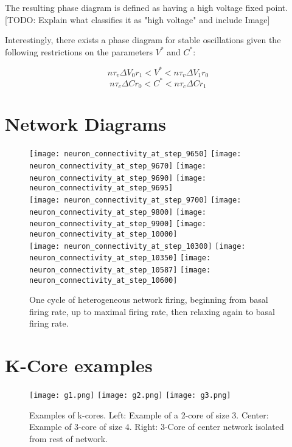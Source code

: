 \documentclass[11pt,letterpaper]{article}
\begin{document}
\begin{appendices}
The resulting phase diagram is defined as having a high voltage fixed point. [TODO: Explain what classifies it as "high voltage" and include Image]

Interestingly, there exists a phase diagram for stable oscillations given the following restrictions on the parameters $V^*$ and $C^*$:

\begin{equation}
n\tau _v \Delta V_0 r_1 < V^* < n\tau _v \Delta V_1 r_0
\end{equation}
\begin{equation}
n\tau _c \Delta C r_0 < C^* < n\tau_c \Delta C r_1
\end{equation}

\newpage
\section{Network Diagrams}
\label{appendix:network_diagrams}
\begin{figure}[!htb]
	\centering
  \texttt{[image: neuron\_connectivity\_at\_step\_9650]}
  \texttt{[image: neuron\_connectivity\_at\_step\_9670]}
  \texttt{[image: neuron\_connectivity\_at\_step\_9690]}
  \texttt{[image: neuron\_connectivity\_at\_step\_9695]}\\
  \texttt{[image: neuron\_connectivity\_at\_step\_9700]}
  \texttt{[image: neuron\_connectivity\_at\_step\_9800]}
  \texttt{[image: neuron\_connectivity\_at\_step\_9900]}
  \texttt{[image: neuron\_connectivity\_at\_step\_10000]}\\
  \texttt{[image: neuron\_connectivity\_at\_step\_10300]}
  \texttt{[image: neuron\_connectivity\_at\_step\_10350]}
  \texttt{[image: neuron\_connectivity\_at\_step\_10587]}
  \texttt{[image: neuron\_connectivity\_at\_step\_10600]}

  \caption{One cycle of heterogeneous network firing, beginning from basal firing rate, up to maximal firing rate, then relaxing again to basal firing rate.}
\end{figure}

\section{K-Core examples}
\label{appendix:kcore_examples}
\begin{figure}[!htb]
	\centering
    	\texttt{[image: g1.png]}
        \texttt{[image: g2.png]}
        \texttt{[image: g3.png]}
    \caption{Examples of k-cores. Left: Example of a 2-core of size 3. Center: Example of 3-core of size 4. Right: 3-Core of center network isolated from rest of network.}
\end{figure}

\end{appendices}
\end{document}
